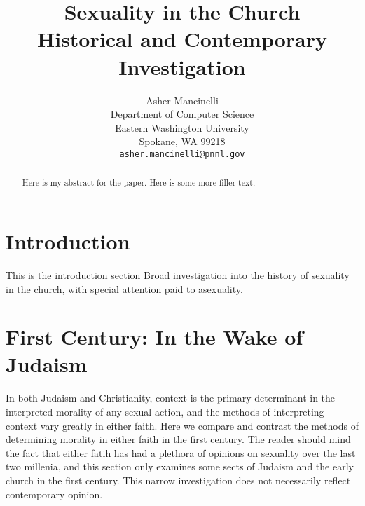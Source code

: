 \documentclass{article}
\title{
    Sexuality in the Church \\ 
    \large Historical and Contemporary Investigation}
\author{
  Asher Mancinelli \\
  Department of Computer Science\\
  Eastern Washington University\\
  Spokane, WA 99218 \\
  \texttt{asher.mancinelli@pnnl.gov} \\ }
\begin{document}
\maketitle

\begin{abstract}
    Here is my abstract for the paper. Here is some more filler text.
\end{abstract}


\linespread{1}

\section{Introduction}
    This is the introduction section
    Broad investigation into the history of sexuality in the church, with
    special attention paid to asexuality.

\section{First Century: In the Wake of Judaism}

In both Judaism and Christianity, context is the primary determinant in 
the interpreted morality of any sexual action, and the methods of interpreting
context vary greatly in either faith. Here we compare and contrast the 
methods of determining morality in either faith in the first century. The
reader should mind the fact that either fatih has had a plethora of opinions on
sexuality over the last two millenia, and this section only examines some sects
of Judaism and the early church in the first century. This narrow investigation
does not necessarily reflect contemporary opinion.
\end{document}
